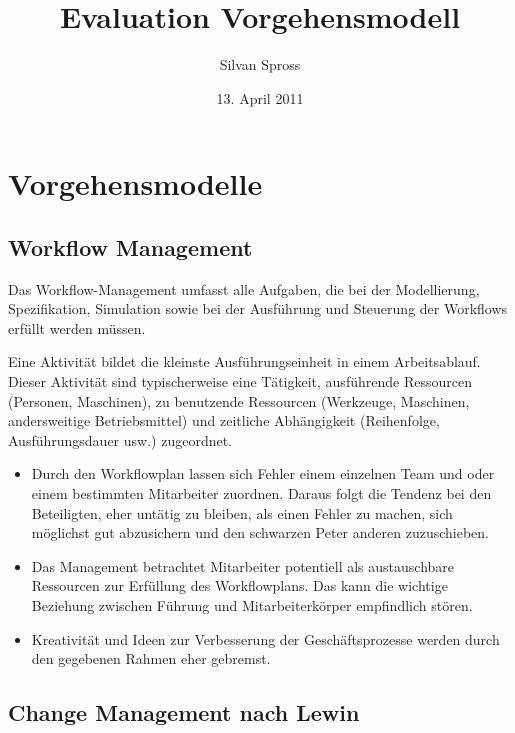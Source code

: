 \documentclass[]{scrreprt}
\title{Evaluation Vorgehensmodell}
\author{Silvan Spross}
\date{13. April 2011}
\begin{document}
    \ifpdf
    \else
    \fi

    \maketitle



    \chapter{Vorgehensmodelle}

    \section{Workflow Management}
    Das Workflow-Management umfasst alle Aufgaben, die bei der Modellierung, 
    Spezifikation, Simulation sowie bei der Ausführung und Steuerung der 
    Workflows erfüllt werden müssen.
    
    Eine Aktivität bildet die kleinste Ausführungseinheit in einem Arbeitsablauf. 
    Dieser Aktivität sind typischerweise eine Tätigkeit, ausführende Ressourcen 
    (Personen, Maschinen), zu benutzende Ressourcen (Werkzeuge, Maschinen, andersweitige Betriebsmittel) 
    und zeitliche Abhängigkeit (Reihenfolge, Ausführungsdauer usw.) zugeordnet.
    
    \begin{itemize}
        \item Durch den Workflowplan lassen sich Fehler einem einzelnen Team und oder einem bestimmten Mitarbeiter zuordnen. Daraus folgt die Tendenz bei den Beteiligten, eher untätig zu bleiben, als einen Fehler zu machen, sich möglichst gut abzusichern und den schwarzen Peter anderen zuzuschieben.
        \item Das Management betrachtet Mitarbeiter potentiell als austauschbare Ressourcen zur Erfüllung des Workflowplans. Das kann die wichtige Beziehung zwischen Führung und Mitarbeiterkörper empfindlich stören.
        \item Kreativität und Ideen zur Verbesserung der Geschäftsprozesse werden durch den gegebenen Rahmen eher gebremst.
    \end{itemize}
    
    \section{Change Management nach Lewin}
\end{document}
